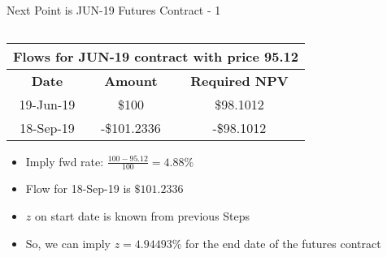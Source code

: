 \documentclass[handout, aspectratio=169]{beamer}
\begin{document}
\begin{frame}{Next Point is JUN-19 Futures Contract - 1}
\begin{columns}[T]
		\begin{column}{0.7\textwidth}
			\begin{table}[t]
				\centering
				\begin{adjustbox}{max width=0.6\textwidth}
					\begin{tabular}{|c|c|c|} 
						\hline
						\multicolumn{3}{|c|}{\textbf{Flows for JUN-19 contract with price 95.12}} \\
						\hline
						\textbf{Date} & \textbf{Amount}  & \textbf{Required NPV}\\				
						\hline
						19-Jun-19 & \$100 & \$98.1012 \\
						\hline
						18-Sep-19 & -\$101.2336 & -\$98.1012 \\
						\hline
					\end{tabular}
				\end{adjustbox}
			\end{table}
			\begin{itemize}
				\item Imply fwd rate: $\frac{100 - 95.12}{100} = 4.88\%$
				\item Flow for 18-Sep-19 is $\$101.2336$
				\item $z$ on start date is known from previous Steps 
				\item So, we can imply $z = 4.94493\%$ for the end date of the futures contract
			\end{itemize}
		 \end{column}
	\end{columns}
\end{frame}
\end{document}
